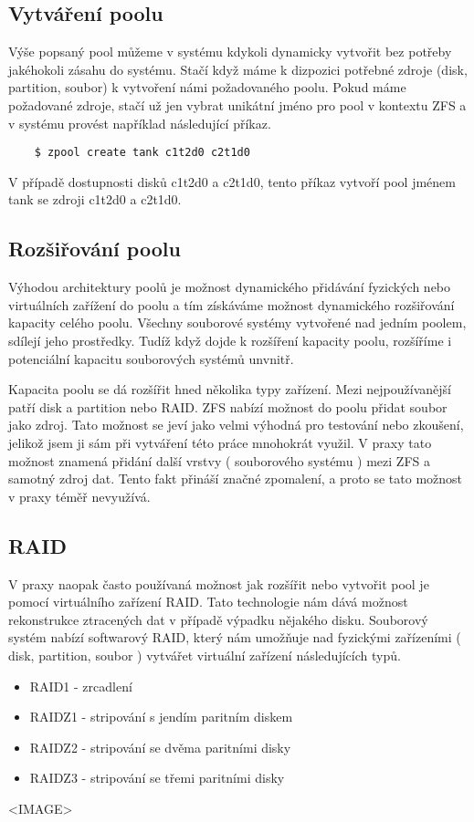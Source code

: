     \subsection{Vytváření poolu}
    Výše popsaný pool můžeme v systému kdykoli dynamicky vytvořit bez potřeby jakéhokoli zásahu do systému. Stačí když máme k dizpozici potřebné zdroje (disk, partition, soubor) k vytvoření námi požadovaného poolu. Pokud máme požadované zdroje, stačí už jen vybrat unikátní jméno pro pool v kontextu ZFS a v systému provést například následující příkaz.
    \begin{verbatim}
    $ zpool create tank c1t2d0 c2t1d0
    \end{verbatim}
    V případě dostupnosti disků c1t2d0 a c2t1d0, tento příkaz vytvoří pool jménem tank se zdroji  c1t2d0 a c2t1d0.
    \subsection{Rozšiřování poolu}
    Výhodou architektury poolů je možnost dynamického přidávání fyzických nebo virtuálních zařížení do poolu a tím získáváme možnost dynamického rozšiřování kapacity celého poolu.
    Všechny souborové systémy vytvořené nad jedním poolem, sdílejí jeho prostředky. Tudíž když dojde k rozšíření kapacity poolu, rozšíříme i potenciální kapacitu souborových systémů unvnitř.

    Kapacita poolu se dá rozšířit hned několika typy zařízení. Mezi nejpoužívanější patří disk a partition nebo RAID. ZFS nabízí možnost do poolu přidat soubor jako zdroj.
    Tato možnost se jeví jako velmi výhodná pro testování nebo zkoušení, jelikož jsem ji sám při vytváření této práce mnohokrát využil. V praxy tato možnost znamená přidání další
    vrstvy ( souborového systému ) mezi ZFS a samotný zdroj dat. Tento fakt přináší značné zpomalení, a proto se tato možnost v praxy téměř nevyužívá.

    \subsection{RAID}
    V praxy naopak často používaná možnost jak rozšířit nebo vytvořit pool je pomocí virtuálního zařízení RAID. Tato technologie nám dává možnost rekonstrukce ztracených dat v případě výpadku nějakého disku. Souborový systém nabízí softwarový RAID, který nám umožňuje nad fyzickými zařízeními ( disk, partition, soubor ) vytvářet virtuální zařízení následujících typů.
    \begin{itemize}
      \item RAID1 - zrcadlení
      \item RAIDZ1 - stripování s jendím paritním diskem
      \item RAIDZ2 - stripování se dvěma paritními disky
      \item RAIDZ3 - stripování se třemi paritními disky
    \end{itemize}
    <IMAGE>

